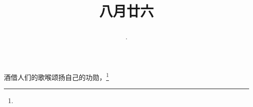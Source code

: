 \title{\date[d=28,m=9,y=2024][year:cn-y,年,month:cn,day:cn,日,·,weekday]·八月廿六 }
酒借人们的歌喉颂扬自己的功勋，\footnote{ }


